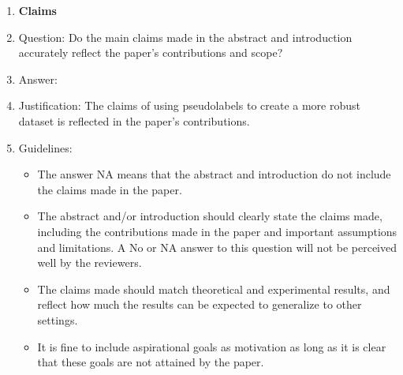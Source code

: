 \documentclass{article}
\begin{document}
\begin{enumerate}

\item {\bf Claims}
    \item[] Question: Do the main claims made in the abstract and introduction accurately reflect the paper's contributions and scope?
    \item[] Answer: \answerYes{} %
    \item[] Justification: The claims of using pseudolabels to create a more robust dataset is reflected in the paper's contributions. 
    \item[] Guidelines:
    \begin{itemize}
        \item The answer NA means that the abstract and introduction do not include the claims made in the paper.
        \item The abstract and/or introduction should clearly state the claims made, including the contributions made in the paper and important assumptions and limitations. A No or NA answer to this question will not be perceived well by the reviewers. 
        \item The claims made should match theoretical and experimental results, and reflect how much the results can be expected to generalize to other settings. 
        \item It is fine to include aspirational goals as motivation as long as it is clear that these goals are not attained by the paper. 
    \end{itemize}


\end{enumerate}
\end{document}
